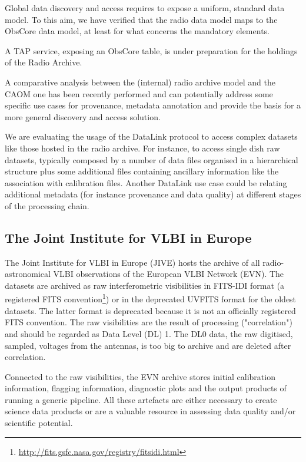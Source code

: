\documentclass[11pt,a4paper]{ivoa}
\begin{document}
Global data discovery and access requires to expose a uniform, standard data model. To this aim, we have verified that the radio data model maps to the ObsCore data model, at least  for what concerns the mandatory elements.

A TAP service, exposing an ObsCore table, is under preparation for the holdings of the Radio Archive.

A comparative analysis between the (internal) radio archive model and the CAOM one has been recently performed and can potentially address some specific use cases for provenance, metadata annotation and provide the basis for a more general discovery and access solution.

We are evaluating the usage of the DataLink protocol to access complex datasets like those hosted in the radio archive. For instance, to access single dish raw datasets, typically composed by a number of data files organised in a hierarchical structure plus some additional files containing ancillary information like the association with calibration files. Another DataLink use case could be relating additional metadata (for instance provenance and data quality) at different stages of the processing chain.

\subsection{The Joint Institute for VLBI in Europe}
\label{sec:JIVE}
The Joint Institute for VLBI in Europe (JIVE) hosts the archive of all radio-astronomical VLBI observations of the European VLBI Network (EVN). The datasets are archived as raw interferometric visibilities in FITS-IDI format (a registered FITS convention\footnote{\url{ http://fits.gsfc.nasa.gov/registry/fitsidi.html}}) or in the deprecated UVFITS format for the oldest datasets. The latter format is deprecated because it is not an officially registered FITS convention. The raw visibilities are the result of processing ("correlation") and should be regarded as Data Level (DL) 1. The DL0 data, the raw digitised, sampled, voltages from the antennas, is too big to archive and are deleted after correlation.

Connected to the raw visibilities, the EVN archive stores initial calibration information, flagging information, diagnostic plots and the output products of running a generic pipeline. All these artefacts are either necessary to create science data products or are a valuable resource in assessing data quality and/or scientific potential.
\end{document}
